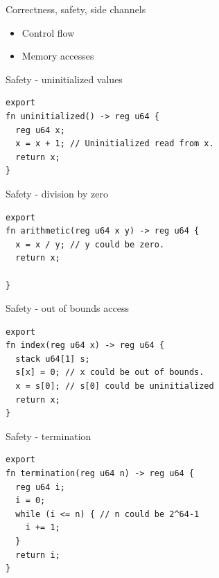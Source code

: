 \begin{frame}{Correctness, safety, side channels}
{\begin{minipage}[t]{0.45\linewidth}
      \begin{itemize}\itemsep=1em
      \item Control flow
      \item Memory accesses
    \end{itemize}
    \end{minipage}}\hfill%
\end{frame}


\begin{frame}[fragile]{Safety - uninitialized values}
  \lstset{
    language=Jasmin,
    basicstyle=\footnotesize\ttfamily,
  }
  \begin{lstlisting}
export
fn uninitialized() -> reg u64 {
  reg u64 x;
  x = x + 1; // Uninitialized read from x.
  return x;
}
  \end{lstlisting}
\end{frame}

\begin{frame}[fragile]{Safety - division by zero}
  \lstset{
    language=Jasmin,
    basicstyle=\footnotesize\ttfamily,
  }
  \begin{lstlisting}
export
fn arithmetic(reg u64 x y) -> reg u64 {
  x = x / y; // y could be zero.
  return x;

}
  \end{lstlisting}
\end{frame}


\begin{frame}[fragile]{Safety - out of bounds access}
  \lstset{
    language=Jasmin,
    basicstyle=\footnotesize\ttfamily,
  }
  \begin{lstlisting}
export
fn index(reg u64 x) -> reg u64 {
  stack u64[1] s;
  s[x] = 0; // x could be out of bounds.
  x = s[0]; // s[0] could be uninitialized
  return x;
}
  \end{lstlisting}
\end{frame}

\begin{frame}[fragile]{Safety - termination}
  \lstset{
    language=Jasmin,
    basicstyle=\footnotesize\ttfamily,
  }
  \begin{lstlisting}
export
fn termination(reg u64 n) -> reg u64 {
  reg u64 i;
  i = 0;
  while (i <= n) { // n could be 2^64-1
    i += 1;
  }
  return i;
}
  \end{lstlisting}
\end{frame}

